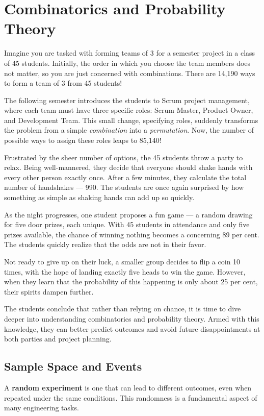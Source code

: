 \chapter{Combinatorics and Probability Theory}
\label{chap:ch4}
Imagine you are tasked with forming teams of 3 for a semester project in a class of 45 students. Initially, the order in which you choose the team members does not matter, so you are just concerned with combinations. There are 14,190 ways to form a team of 3 from 45 students!

The following semester introduces the students to Scrum project management, where each team must have three specific roles: Scrum Master, Product Owner, and Development Team. This small change, specifying roles, suddenly transforms the problem from a simple \textit{combination} into a \textit{permutation}. Now, the number of possible ways to assign these roles leaps to 85,140!

Frustrated by the sheer number of options, the 45 students throw a party to relax. Being well-mannered, they decide that everyone should shake hands with every other person exactly once. After a few minutes, they calculate the total number of handshakes — 990. The students are once again surprised by how something as simple as shaking hands can add up so quickly.

As the night progresses, one student proposes a fun game — a random drawing for five door prizes, each unique. With 45 students in attendance and only five prizes available, the chance of winning nothing becomes a concerning 89 per cent. The students quickly realize that the odds are not in their favor.

Not ready to give up on their luck, a smaller group decides to flip a coin 10 times, with the hope of landing exactly five heads to win the game. However, when they learn that the probability of this happening is only about 25 per cent, their spirits dampen further.

The students conclude that rather than relying on chance, it is time to dive deeper into understanding combinatorics and probability theory. Armed with this knowledge, they can better predict outcomes and avoid future disappointments at both parties and project planning.

\section{Sample Space and Events}
\label{sec:sample_space}
A \textbf{random experiment }is one that can lead to different outcomes, even when repeated under the same conditions. This randomness is a fundamental aspect of many engineering tasks.

